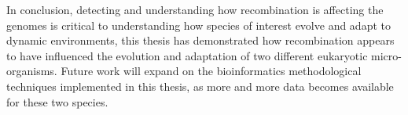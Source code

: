 In conclusion, detecting and understanding how recombination is affecting the genomes is critical to understanding how species of interest evolve and adapt to dynamic environments, this thesis has demonstrated how recombination appears to have influenced the evolution and adaptation of two different eukaryotic micro-organisms.
Future work will expand on the bioinformatics methodological techniques implemented in this thesis, as more and more data becomes available for these two species.  


